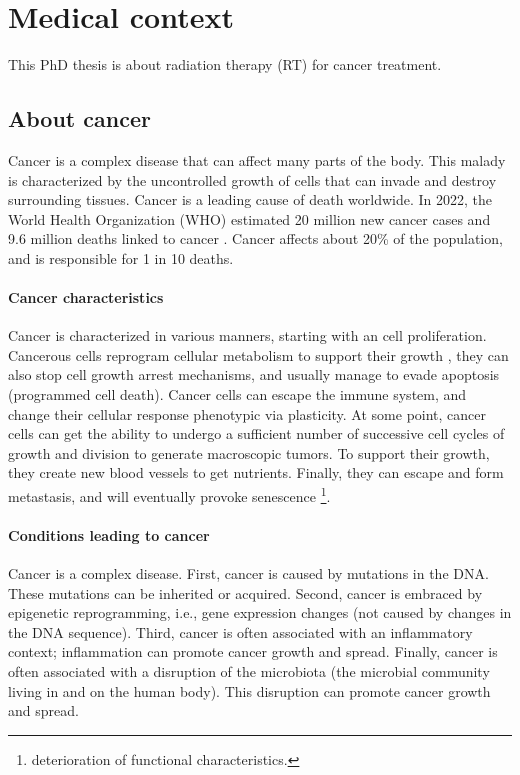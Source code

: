 \section{Medical context}
This PhD thesis is about radiation therapy (RT) for cancer treatment.

\subsection{About cancer}
Cancer is a complex disease that can affect many parts of the body.
This malady is characterized by the uncontrolled growth of cells that can invade and destroy surrounding tissues.
Cancer is a leading cause of death worldwide.
In 2022, the World Health Organization (WHO) estimated 20 million new cancer cases and 9.6 million deaths linked to cancer \cite{who_cancer2022}.
Cancer affects about 20\% of the population, and is responsible for 1 in 10 deaths.

\paragraph{Cancer characteristics}
Cancer is characterized in various manners, starting with an cell proliferation.
Cancerous cells reprogram cellular metabolism to support their growth \cite{Chammas2013}, they can also stop cell growth arrest mechanisms, and usually manage to evade apoptosis (programmed cell death).
Cancer cells can escape the immune system, and change their cellular response phenotypic via plasticity.
At some point, cancer cells can get the ability to undergo a sufficient number of successive cell cycles of growth and division to generate macroscopic tumors.
To support their growth, they create new blood vessels to get nutrients.
Finally, they can escape and form metastasis, and will eventually provoke senescence \footnote{deterioration of functional characteristics.}.

\paragraph{Conditions leading to cancer}
Cancer is a complex disease.
First, cancer is caused by mutations in the DNA.
These mutations can be inherited or acquired.
Second, cancer is embraced by epigenetic reprogramming, i.e., gene expression changes (not caused by changes in the DNA sequence).
Third, cancer is often associated with an inflammatory context; inflammation can promote cancer growth and spread.
Finally, cancer is often associated with a disruption of the microbiota (the microbial community living in and on the human body).
This disruption can promote cancer growth and spread.

